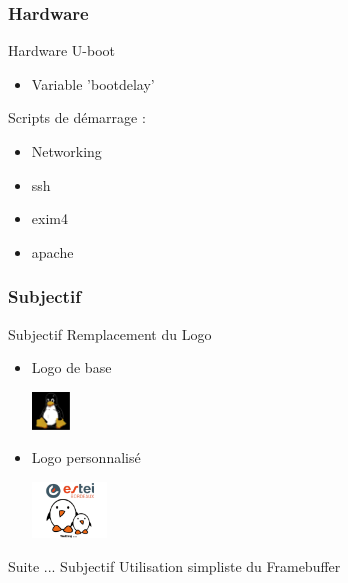 \documentclass[11pt]{beamer}
\begin{document}
	\subsubsection[]{Hardware}
	\begin{frame}[label=optimisation]{Hardware}
	U-boot
	\begin{itemize}
			\item Variable 'bootdelay'
	\end{itemize}
	Scripts de démarrage : \hyperlink{bootchart}{}\\
	\begin{itemize}
			\item Networking
			\item ssh
			\item exim4
			\item apache
	\end{itemize}
	\end{frame}
	\subsubsection[]{Subjectif}
	\begin{frame}{Subjectif}
	Remplacement du Logo 
	\begin{itemize}
	\item Logo de base 
		\begin{center}
		 \includegraphics[width=1cm]{common/logo_1.png}
		\end{center}
	\item Logo personnalisé
		\begin{center}
		 \includegraphics[width=2cm]{common/logo_2.png}
		\end{center}
	\end{itemize}
	\end{frame}
	
	\begin{frame}{Suite ... Subjectif}
	Utilisation simpliste du Framebuffer
	\end{frame}
\end{document}
